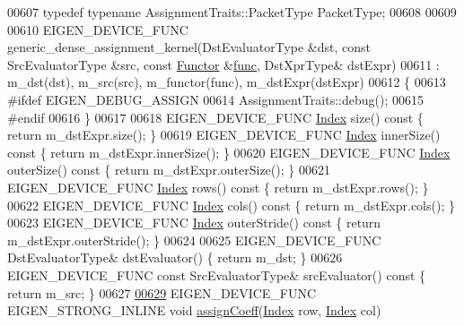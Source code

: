 \begin{DoxyCode}
00607   \textcolor{keyword}{typedef} \textcolor{keyword}{typename} AssignmentTraits::PacketType PacketType;
00608   
00609   
00610   EIGEN\_DEVICE\_FUNC generic\_dense\_assignment\_kernel(DstEvaluatorType &dst, \textcolor{keyword}{const} SrcEvaluatorType &src, \textcolor{keyword}{
      const} \hyperlink{struct_functor}{Functor} &\hyperlink{structfunc}{func}, DstXprType& dstExpr)
00611     : m\_dst(dst), m\_src(src), m\_functor(func), m\_dstExpr(dstExpr)
00612   \{
00613 \textcolor{preprocessor}{    #ifdef EIGEN\_DEBUG\_ASSIGN}
00614     AssignmentTraits::debug();
00615 \textcolor{preprocessor}{    #endif}
00616   \}
00617   
00618   EIGEN\_DEVICE\_FUNC \hyperlink{namespace_eigen_a62e77e0933482dafde8fe197d9a2cfde}{Index} size()\textcolor{keyword}{ const        }\{ \textcolor{keywordflow}{return} m\_dstExpr.size(); \}
00619   EIGEN\_DEVICE\_FUNC \hyperlink{namespace_eigen_a62e77e0933482dafde8fe197d9a2cfde}{Index} innerSize()\textcolor{keyword}{ const   }\{ \textcolor{keywordflow}{return} m\_dstExpr.innerSize(); \}
00620   EIGEN\_DEVICE\_FUNC \hyperlink{namespace_eigen_a62e77e0933482dafde8fe197d9a2cfde}{Index} outerSize()\textcolor{keyword}{ const   }\{ \textcolor{keywordflow}{return} m\_dstExpr.outerSize(); \}
00621   EIGEN\_DEVICE\_FUNC \hyperlink{namespace_eigen_a62e77e0933482dafde8fe197d9a2cfde}{Index} rows()\textcolor{keyword}{ const        }\{ \textcolor{keywordflow}{return} m\_dstExpr.rows(); \}
00622   EIGEN\_DEVICE\_FUNC \hyperlink{namespace_eigen_a62e77e0933482dafde8fe197d9a2cfde}{Index} cols()\textcolor{keyword}{ const        }\{ \textcolor{keywordflow}{return} m\_dstExpr.cols(); \}
00623   EIGEN\_DEVICE\_FUNC \hyperlink{namespace_eigen_a62e77e0933482dafde8fe197d9a2cfde}{Index} outerStride()\textcolor{keyword}{ const }\{ \textcolor{keywordflow}{return} m\_dstExpr.outerStride(); \}
00624   
00625   EIGEN\_DEVICE\_FUNC DstEvaluatorType& dstEvaluator() \{ \textcolor{keywordflow}{return} m\_dst; \}
00626   EIGEN\_DEVICE\_FUNC \textcolor{keyword}{const} SrcEvaluatorType& srcEvaluator()\textcolor{keyword}{ const }\{ \textcolor{keywordflow}{return} m\_src; \}
00627   
\hyperlink{class_eigen_1_1internal_1_1generic__dense__assignment__kernel_a7ca974cc4049f1ef3d6f2feac94ea35b}{00629}   EIGEN\_DEVICE\_FUNC EIGEN\_STRONG\_INLINE \textcolor{keywordtype}{void} \hyperlink{class_eigen_1_1internal_1_1generic__dense__assignment__kernel_a7ca974cc4049f1ef3d6f2feac94ea35b}{assignCoeff}(\hyperlink{namespace_eigen_a62e77e0933482dafde8fe197d9a2cfde}{Index} row, 
      \hyperlink{namespace_eigen_a62e77e0933482dafde8fe197d9a2cfde}{Index} col)

\end{DoxyCode}
